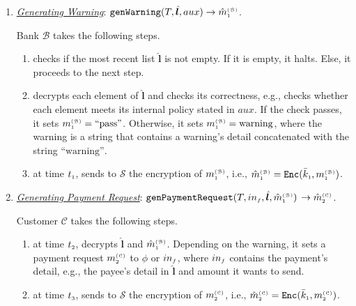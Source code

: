 \begin{enumerate}[leftmargin=.46cm]
 



\item\label{Generating-Warning} \underline{\textit{Generating Warning}}: $\mathtt{genWarning}(T, {\hat{\bm l}}, aux)\rightarrow \hat m^{\scriptscriptstyle\mathcal{(B)}}_{\scriptscriptstyle1}$.

Bank $\mathcal{B}$ takes the following steps. 
\begin{enumerate}
%
\item  checks if the most recent list $\hat{\bm{l}}$ is  not empty. If it is empty, it halts. Else, it proceeds to the next step. 
%
\item  decrypts each element of $\hat{\bm l}$ and checks its correctness, e.g., checks whether each element meets its internal policy  stated in $aux$. If the check passes, it sets $m_{\scriptscriptstyle 1}^{\scriptscriptstyle(\mathcal{B})}= \text{``pass''}$. Otherwise, it sets $m_{\scriptscriptstyle 1}^{\scriptscriptstyle(\mathcal{B})}=\text{warning}$, where the warning is a  string that contains a warning's detail concatenated with the string $\text{``warning''}$.
%
\item at time $t_{\scriptscriptstyle 1}$, sends to $\mathcal{S}$ the encryption of $m_{\scriptscriptstyle 1}^{\scriptscriptstyle(\mathcal{B})}$, i.e.,  $\hat m_{\scriptscriptstyle 1}^{\scriptscriptstyle(\mathcal{B})}= \mathtt{Enc}(\bar k_{\scriptscriptstyle 1}, m_{\scriptscriptstyle 1}^{\scriptscriptstyle(\mathcal B)})$. 
\end{enumerate}



\item\label{clinet-at-T2} \underline{\textit{Generating Payment Request}}: $\mathtt{genPaymentRequest}(T, in_{\scriptscriptstyle f}, \hat{\bm{l}}, \hat m^{\scriptscriptstyle\mathcal{(B)}}_{\scriptscriptstyle1})$ $\rightarrow \hat m^{\scriptscriptstyle\mathcal{(C)}}_{\scriptscriptstyle2}$.

Customer $\mathcal{C}$ takes the following steps. 
\begin{enumerate}
%
\item\label{decrypt-warning} at time $t_{\scriptscriptstyle 2}$, decrypts  $\hat{\bm{l}}$ and $ \hat m_{\scriptscriptstyle 1}^{\scriptscriptstyle(\mathcal{B})}$.  Depending on the warning, it sets a payment request $m_{\scriptscriptstyle 2}^{\scriptscriptstyle(\mathcal C)}$ to  $\phi$ or  $in_{\scriptscriptstyle f}$, where $in_{\scriptscriptstyle f}$ contains the payment's detail, e.g., the payee's detail in $\hat {\bm l}$ and amount it wants to send. 
%
\item\label{send-payment-req} at time $t_{\scriptscriptstyle 3}$, sends  to $\mathcal{S}$ the encryption of $m_{\scriptscriptstyle 2}^{\scriptscriptstyle(\mathcal C)}$, i.e., $\hat m_{\scriptscriptstyle 2}^{\scriptscriptstyle(\mathcal{C})} = \mathtt{Enc}(\bar k_{\scriptscriptstyle 1}, m_{\scriptscriptstyle 2}^{\scriptscriptstyle(\mathcal C)})$.
\end{enumerate}
%


\end{enumerate}
